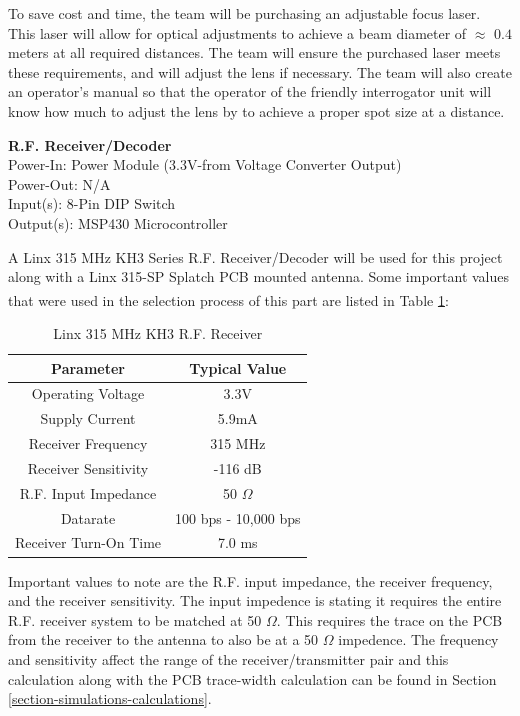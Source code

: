 \documentclass[letterpaper,10pt]{article}
\begin{document}
\begin{spacing}{1.15}
To save cost and time, the team will be purchasing an adjustable focus laser. This laser will allow for optical adjustments to achieve a beam diameter of $\approx$ $0.4$ meters at all required distances. The team will ensure the purchased laser meets these requirements, and will adjust the lens if necessary. The team will also create an operator's manual so that the operator of the friendly interrogator unit will know how much to adjust the lens by to achieve a proper spot size at a distance.

\normalsize\textbf{R.F. Receiver/Decoder} \\
Power-In: Power Module (3.3V-from Voltage Converter Output) \\
Power-Out: N/A \\
Input(s): 8-Pin DIP Switch\\
Output(s): MSP430 Microcontroller

A Linx 315 MHz KH3 Series R.F. Receiver/Decoder will be used for this project along with a Linx 315-SP Splatch PCB mounted antenna. Some important values that were used in the selection process of this part are listed in Table \ref{tab:rf-receiver-important-values}\textsuperscript{\cite{Linx-Receiver}\cite{Linx-Antenna}}:

\begin{table}[htbp]
	\centering
	\begin{tabular}{c|c}	%
		\toprule	%
		Parameter & Typical Value \\
		\midrule
		Operating Voltage & 3.3V\\
	 	Supply Current & 5.9mA\\
		Receiver Frequency & 315 MHz \\ 
		Receiver Sensitivity & -116 dB \\
		R.F. Input Impedance & 50 $\Omega$ \\
		Datarate & 100 bps - 10,000 bps  \\
		Receiver Turn-On Time & 7.0 ms  \\
		\bottomrule	%
	\end{tabular}%
	\caption{Linx 315 MHz KH3 R.F. Receiver}
	\label{tab:rf-receiver-important-values}	%
\end{table}%

Important values to note are the R.F. input impedance, the receiver frequency, and the receiver sensitivity. The input impedence is stating it requires the entire R.F. receiver system to be matched at 50 $\Omega$. This requires the trace on the PCB from the receiver to the antenna to also be at a 50 $\Omega$ impedence. The frequency and sensitivity affect the range of the receiver/transmitter pair and this calculation along with the PCB trace-width calculation can be found in Section \ref{section-simulations-calculations}.


\end{spacing}
\end{document}
